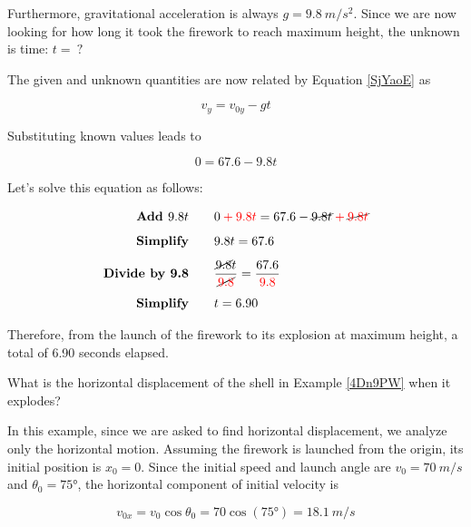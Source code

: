 \documentclass[dvipsnames]{article}
\numberwithin{equation}{section}
\numberwithin{figure}{section}
\begin{document}
Furthermore, gravitational acceleration is always $g = \SI{9.8}{m/s^2}$. Since we are now looking for how long it took the firework to reach maximum height, the unknown is time: $t =\ ?$

\vspace{1em}

The given and unknown quantities are now related by Equation \eqref{SjYaoE} as 

\begin{equation*}
    v_y = v_{0y} - gt
\end{equation*}

Substituting known values leads to

\begin{equation*}
    0 = 67.6 - 9.8 t
\end{equation*}

Let's solve this equation as follows:

\begin{align*}
    \textbf{Add $9.8 t$} \qquad & 0 \mathbin{\color{red} +} \textcolor{red}{9.8 t} = 67.6 - \cancel{9.8 t} \mathbin{\color{red} +} \cancel{\textcolor{red}{9.8 t}}\\[1ex]
    \textbf{Simplify} \qquad & 9.8 t = 67.6\\[1ex]
    \textbf{Divide by 9.8} \qquad & \frac{\cancel{9.8} t}{\cancel{\textcolor{red}{9.8}}} = \frac{67.6}{\textcolor{red}{9.8}}\\[1ex]
    \textbf{Simplify} \qquad & t = 6.90
\end{align*}

Therefore, from the launch of the firework to its explosion at maximum height, a total of 6.90 seconds elapsed.

\solutionEnd

\begin{example} 
    What is the horizontal displacement of the shell in Example \ref{4Dn9PW} when it explodes?
\end{example}

\Solution In this example, since we are asked to find horizontal displacement, we analyze only the horizontal motion. Assuming the firework is launched from the origin, its initial position is $x_0 = 0$. Since the initial speed and launch angle are $v_0 = \SI{70}{m/s}$ and $\theta_0 = \ang{75}$,  the horizontal component of initial velocity is

\begin{equation*}
    v_{0x} = v_0 \cos{\theta_0} = 70 \cos{(\ang{75})} = \SI{18.1}{m/s}
\end{equation*}
\end{document}
